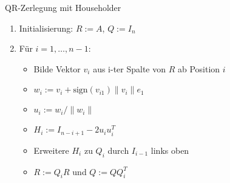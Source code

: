 \begin{KR}{QR-Zerlegung mit Householder}
\begin{enumerate}
    \item Initialisierung: $R := A$, $Q := I_n$
    \item Für $i = 1,\ldots,n-1$:
        \begin{itemize}
            \item Bilde Vektor $v_i$ aus i-ter Spalte von $R$ ab Position $i$
            \item $w_i := v_i + \text{sign}(v_{i1})\|v_i\|e_1$
            \item $u_i := w_i/\|w_i\|$
            \item $H_i := I_{n-i+1} - 2u_iu_i^T$
            \item Erweitere $H_i$ zu $Q_i$ durch $I_{i-1}$ links oben
            \item $R := Q_iR$ und $Q := QQ_i^T$
        \end{itemize}
\end{enumerate}
\end{KR}

